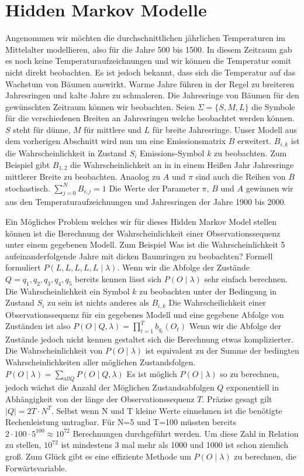 \section{Hidden Markov Modelle}
Angenommen wir möchten die durchschnittlichen jährlichen Temperaturen 
im Mittelalter modellieren, also für die Jahre 500 bis 1500. In diesem Zeitraum gab es 
noch keine Temperaturaufzeichnungen und wir können die Temperatur somit nicht direkt beobachten.
Es ist jedoch bekannt, dass sich die Temperatur auf das Wachstum von Bäumen auswirkt.
Warme Jahre führen in der Regel zu breiteren Jahresringen und kalte Jahre zu schmaleren.
Die Jahresringe von Bäumen für den gewünschten Zeitraum können wir beobachten.
Seien $\Sigma = \{S, M, L\}$ die Symbole für die verschiedenen Breiten an Jahresringen welche beobachtet werden können.
$S$ steht für dünne, $M$ für mittlere und $L$ für breite Jahresringe.
Unser Modell aus dem vorherigen Abschnitt wird nun um eine Emissionsmatrix $B$ erweitert.
$B_{i, k}$ ist die Wahrscheinlichkeit in Zustand $S_i$ Emissions-Symbol $k$ zu beobachten.
Zum Beispiel gibt $B_{1, 2}$ die Wahrscheinlichkeit an in in einem Heißen Jahr 
Jahresringe mittlerer Breite zu beobachten. Anaolog zu $A$ und $\pi$ sind auch die Reihen von $B$ stochastisch. 
$\sum_{j = 0}^{N} B_{i,j} = 1 $
Die Werte der Parameter $\pi$, $B$ und $A$ gewinnen wir aus den Temperaturaufzeichnungen und Jahresringen der Jahre 1900 bis 2000.

Ein Mögliches Problem welches wir für dieses Hidden Markov Model stellen können ist die Berechnung der Wahrscheinlichkeit
einer Observationssequenz unter einem gegebenen Modell. Zum Beispiel Was ist die Wahrscheinlichkeit 5 aufeinanderfolgende 
Jahre mit dicken Baumringen zu beobachten? Formell formuliert $P({L, L, L, L, L} \mid \lambda)$.
Wenn wir die Abfolge der Zustände $Q={q_1, q_2, q_3, q_4, q_5}$ bereits kennen lässt sich $P(O \mid \lambda)$
sehr einfach berechnen. Die Wahrscheinlichkeit ein Symbol $k$ zu beobachten 
unter der Bedingung in Zustand $S_i$ zu sein ist nichts anderes als $B_{i,k}$
Die Wahrscheilichkeit einer Observationssequenz für ein gegebenes Modell und eine gegebene Abfolge von Zuständen ist also
$P(O \mid Q, \lambda) =  \prod_{t=1}^{T} b_{q_t}(O_t)$
Wenn wir die Abfolge der Zustände jedoch nicht kennen gestaltet sich die Berechnung etwas komplizierter.
Die Wahrscheinlichkeit von $P(O \mid \lambda)$ ist equivalent zu der 
Summe der bedingten Wahrscheinlichkeiten aller möglichen Zustandsfolgen.
$P(O \mid \lambda) = \sum_{all Q} P(O \mid Q, \lambda )$
Es ist möglich $P(O \mid \lambda)$ so zu berechnen, jedoch wächst die 
Anzahl der Möglichen Zustandsabfolgen $Q$ exponentiell in Abhängigkeit von der länge der Observationssequenz $T$.
Präzise gesagt gilt $|Q| = 2T \cdot N^T$. Selbst wenn N und T kleine Werte einnehmen
ist die benötigte Rechenleistung untragbar. Für N=5 und T=100
müssten bereits $2 \cdot 100 \cdot 5^{100} \approx 10^{72}$ Berechnungen durchgeführt werden.
Um diese Zahl in Relation zu stellen, $10^{72}$ ist mindestens 3 mal mehr als 1000 und 1000 ist schon ziemlich groß.
Zum Glück gibt es eine effiziente Methode um $P(O \mid \lambda)$ zu berechnen, die Forwärtsvariable.

